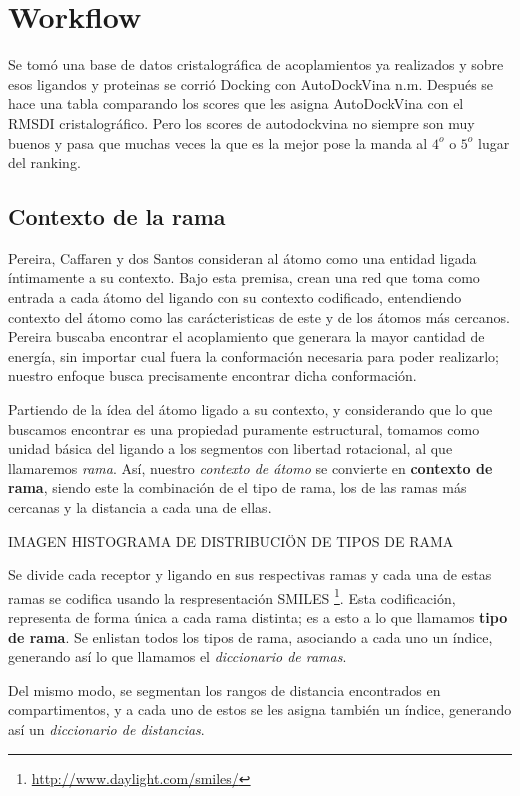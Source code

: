 \section{Workflow}
Se tomó una base de datos cristalográfica de acoplamientos ya
realizados y sobre esos ligandos y proteinas se corrió Docking con
AutoDockVina n.m. Después se hace una tabla comparando los scores que
les asigna AutoDockVina con el RMSDI cristalográfico. Pero los scores
de autodockvina no siempre son muy buenos y pasa que muchas veces la
que es la mejor pose la manda al $4^o$ o $5^o$ lugar del ranking.

\subsection{Contexto de la rama}
Pereira, Caffaren y dos Santos \cite{dossantos} consideran al átomo
como una entidad ligada íntimamente a su contexto. Bajo esta premisa,
crean una red que toma como entrada a cada átomo del ligando con su
contexto codificado, entendiendo contexto del átomo como las
carácteristicas de este y de los átomos más cercanos.
Pereira buscaba encontrar el acoplamiento que generara la mayor
cantidad de energía, sin importar cual fuera la conformación necesaria
para poder realizarlo; nuestro enfoque busca precisamente encontrar
dicha conformación.

Partiendo de la ídea del átomo ligado a su contexto, y considerando
que lo que buscamos encontrar es una propiedad puramente estructural,
tomamos como unidad básica del ligando a los segmentos con libertad
rotacional, al que llamaremos \textit{rama}. Así, nuestro
\textit{contexto de átomo} se convierte en \textbf{contexto de rama},
siendo este la combinación de el tipo de rama, los de las ramas más
cercanas y la distancia a cada una de ellas.

IMAGEN HISTOGRAMA DE DISTRIBUCIÖN DE TIPOS DE RAMA

Se divide cada receptor y ligando en sus respectivas ramas y cada una
de estas ramas se codifica usando la respresentación
SMILES \footnote{\url{http://www.daylight.com/smiles/}}. Esta
codificación, representa de forma única a cada rama distinta; es a
esto a lo que llamamos \textbf{tipo de rama}. Se enlistan todos los
tipos de rama, asociando a cada uno un índice, generando así lo que
llamamos el \textit{diccionario de ramas}.

Del mismo modo, se segmentan los rangos de distancia encontrados en
compartimentos, y a cada uno de estos se les asigna también un índice,
generando así un \textit{diccionario de distancias}.


